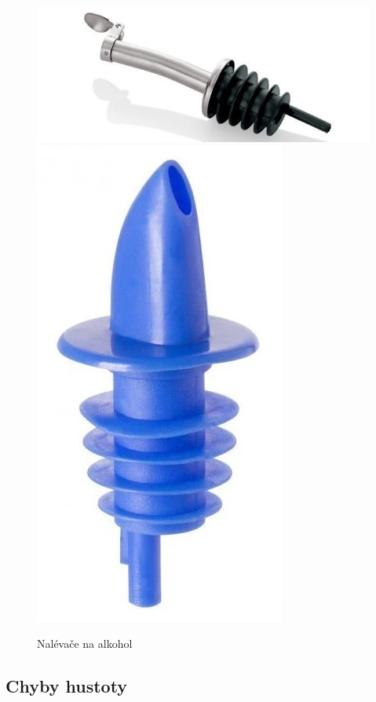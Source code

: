 \begin{figure}[H]
    \begin{center}
        \includegraphics[scale=0.6]{obrazky/nalevac.jpg}
        \includegraphics[scale=0.15]{obrazky/nelévač_plast.jpg}
    \end{center}
    \label{nalevačos}
    \caption{Nalévače na alkohol \cite{nalevatko}}
\end{figure}

\subsection{Chyby hustoty}
\label{Chyby hustoty}

